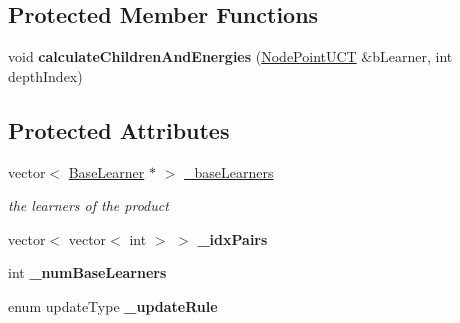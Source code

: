 \subsection*{Protected Member Functions}
\begin{DoxyCompactItemize}
\item 
\hypertarget{classMultiBoost_1_1TreeLearnerUCT_a27ed9aa3cb5e7e557bca2a164e5849a3}{
void {\bfseries calculateChildrenAndEnergies} (\hyperlink{structMultiBoost_1_1NodePointUCT}{NodePointUCT} \&bLearner, int depthIndex)}
\label{classMultiBoost_1_1TreeLearnerUCT_a27ed9aa3cb5e7e557bca2a164e5849a3}

\end{DoxyCompactItemize}
\subsection*{Protected Attributes}
\begin{DoxyCompactItemize}
\item 
\hypertarget{classMultiBoost_1_1TreeLearnerUCT_ac499afbd6f5c3ecc78095cd9d76c852a}{
vector$<$ \hyperlink{classMultiBoost_1_1BaseLearner}{BaseLearner} $\ast$ $>$ \hyperlink{classMultiBoost_1_1TreeLearnerUCT_ac499afbd6f5c3ecc78095cd9d76c852a}{\_\-baseLearners}}
\label{classMultiBoost_1_1TreeLearnerUCT_ac499afbd6f5c3ecc78095cd9d76c852a}

\begin{DoxyCompactList}\small\item\em the learners of the product \end{DoxyCompactList}\item 
\hypertarget{classMultiBoost_1_1TreeLearnerUCT_a14a394e4868a42964b573fd513ef6e03}{
vector$<$ vector$<$ int $>$ $>$ {\bfseries \_\-idxPairs}}
\label{classMultiBoost_1_1TreeLearnerUCT_a14a394e4868a42964b573fd513ef6e03}

\item 
\hypertarget{classMultiBoost_1_1TreeLearnerUCT_ab7b0c4f70dc1362e5b03f818dc40fa42}{
int {\bfseries \_\-numBaseLearners}}
\label{classMultiBoost_1_1TreeLearnerUCT_ab7b0c4f70dc1362e5b03f818dc40fa42}

\item 
\hypertarget{classMultiBoost_1_1TreeLearnerUCT_af17e1ca31410035c9b1acf5093e872cc}{
enum updateType {\bfseries \_\-updateRule}}
\label{classMultiBoost_1_1TreeLearnerUCT_af17e1ca31410035c9b1acf5093e872cc}

\end{DoxyCompactItemize}
